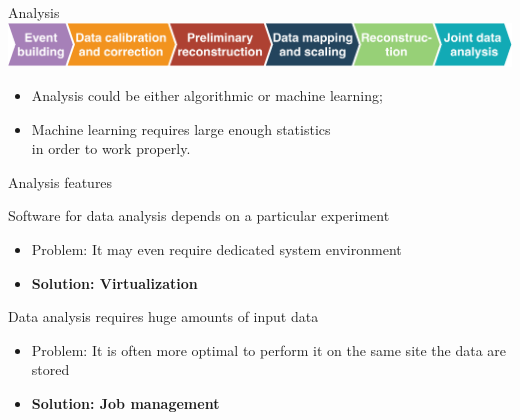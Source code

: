 \begin{frame}{Analysis}
\includegraphics[width=1\textwidth]{pics/an_steps.pdf}
\vspace{2em}

\begin{itemize}
\item Analysis could be either algorithmic or machine learning;
\item Machine learning requires large enough statistics\\in order to work properly.
\end{itemize}
\end{frame}

\begin{frame}{Analysis features}
\vspace{-3em}
\begin{block}{Software for data analysis depends on a particular experiment}
  \begin{itemize}
    \item Problem: It may even require dedicated system environment
    \item \textbf{Solution: Virtualization\footnotemark[2]}
  \end{itemize}
\end{block}

\begin{block}{Data analysis requires huge amounts of input data}
  \begin{itemize}
    \item Problem: It is often more optimal to perform it on the same site the data are stored
    \item \textbf{Solution: Job management}
  \end{itemize}
\end{block}
  \footnotesize{}
\end{frame}

